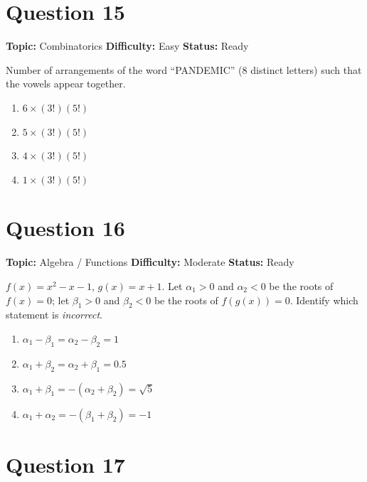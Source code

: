 \documentclass[11pt]{article}
\begin{document}
\newpage

\section*{Question 15}


\noindent\textbf{Topic:} Combinatorics \quad \textbf{Difficulty:} Easy \quad \textbf{Status:} Ready



Number of arrangements of the word ``PANDEMIC'' (8 distinct letters) such that the vowels
appear together.
\begin{enumerate}[label=(\Alph*)]
\item $6 \times (3!)(5!)$
\item $5 \times (3!)(5!)$
\item $4 \times (3!)(5!)$
\item $1 \times (3!)(5!)$
\end{enumerate}

\newpage

\section*{Question 16}


\noindent\textbf{Topic:} Algebra / Functions \quad \textbf{Difficulty:} Moderate \quad \textbf{Status:} Ready



$f(x) = x^2 - x - 1$, $g(x) = x + 1$. Let $\alpha_1 > 0$ and $\alpha_2 < 0$ be the roots of $f(x)=0$;
let $\beta_1 > 0$ and $\beta_2 < 0$ be the roots of $f(g(x))=0$. Identify which statement is
\emph{incorrect}.
\begin{enumerate}[label=(\Alph*)]
\item $\alpha_1 - \beta_1 = \alpha_2 - \beta_2 = 1$
\item $\alpha_1 + \beta_2 = \alpha_2 + \beta_1 = 0.5$  \quad [as printed]
\item $\alpha_1 + \beta_1 = -(\alpha_2 + \beta_2) = \sqrt 5$
\item $\alpha_1 + \alpha_2 = -(\beta_1 + \beta_2) = -1$
\end{enumerate}

\newpage

\section*{Question 17}
\end{document}
